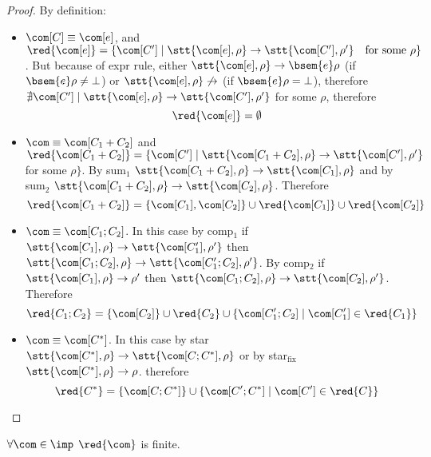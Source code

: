 \begin{proof}
  By definition:
  \begin{itemize}
  \item \(\com[C]\equiv \com[e]\), and \(\red{\com[e]} = \{\com[C'] \mid
    \stt{\com[e], \rho} \to \stt{\com[C'], \rho'} \quad \text{for some }
    \rho\}\). But because of expr rule, either \(\stt{\com[e], \rho}
    \to \bsem{e}\rho\) (if \(\bsem{e}\rho \neq \bot\)) or
    \(\stt{\com[e], \rho} \not\to\) (if \(\bsem{e}\rho = \bot\)),
    therefore \(\nexists \com[C'] \mid \stt{\com[e], \rho} \to
    \stt{\com[C'], \rho'}\) for some \(\rho\), therefore \[\red{\com[e]}
    = \emptyset\]
  \item \(\com \equiv \com[C_1 + C_2]\) and \(\red{\com[C_1 + C_2]} =
    \{\com[C'] \mid \stt{\com[C_1 + C_2], \rho} \to \stt{\com[C'],
      \rho'}\) for some \(\rho\}\). By sum\(_1\) \(\stt{\com[C_1 +
        C_2], \rho} \to \stt{\com[C_1], \rho}\) and by sum\(_2\)
    \(\stt{\com[C_1 + C_2], \rho} \to \stt{\com[C_2],
      \rho}\). Therefore \[\red{\com[C_1 + C_2]} = \{\com[C_1],
    \com[C_2]\}\cup \red{\com[C_1]} \cup \red{\com[C_2]}\]
  \item \(\com \equiv \com[C_1;C_2]\). In this case by comp\(_1\) if
    \(\stt{\com[C_1], \rho}\to \stt{\com[C_1'], \rho'}\) then
    \(\stt{\com[C_1;C_2],\rho} \to \stt{\com[C_1';C_2], \rho'}\). By
    comp\(_2\) if \(\stt{\com[C_1], \rho}\to \rho'\) then
    \(\stt{\com[C_1;C_2],\rho} \to \stt{\com[C_2],
      \rho'}\). Therefore \[\red{C_1;C_2} = \{\com[C_2]\}\cup
    \red{C_2}\cup\{\com[C_1';C_2] \mid \com[C_1']\in\red{C_1}\}\]
  \item \(\com \equiv \com[C^*]\). In this case by star
    \(\stt{\com[C^*], \rho} \to \stt{\com[C;C^*], \rho}\) or by
    star\(_{\text{fix}}\) \(\stt{\com[C^*], \rho} \to
    \rho\). therefore \[\red{C^*} = \{\com[C;C^*]\} \cup
    \{\com[C';C^*]\mid \com[C']\in\red{C}\}\]
  \end{itemize}
\end{proof}

\begin{lemma}\label{le:reductionsfinite}
  \(\forall \com \in \imp\) \(\red{\com}\) is finite.
\end{lemma}

